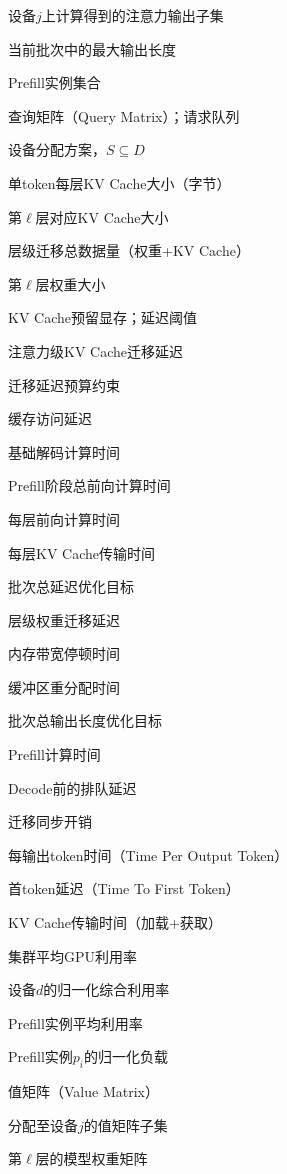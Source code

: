 \begin{denotation}[3cm]
  \item[$O^{(j)}$]设备$j$上计算得到的注意力输出子集
  \item[$O_{CM}$]当前批次中的最大输出长度
  \item[$P$]Prefill实例集合
  \item[$Q$]查询矩阵（Query Matrix）；请求队列
  \item[$S$]设备分配方案，$S\subseteq D$
  \item[$S_{kv}$]单token每层KV Cache大小（字节）
  \item[$S^{kv}_\ell$]第$\ell$层对应KV Cache大小
  \item[$S^{\text{total}}_\ell$]层级迁移总数据量（权重+KV Cache）
  \item[$S^w_\ell$]第$\ell$层权重大小
  \item[$T$]KV Cache预留显存；延迟阈值
  \item[$T_{\text{attn}}$]注意力级KV Cache迁移延迟
  \item[$T_{\text{budget}}$]迁移延迟预算约束
  \item[$T_c$]缓存访问延迟
  \item[$T_d$]基础解码计算时间
  \item[$T_F$]Prefill阶段总前向计算时间
  \item[$T_{F,\text{layer}}$]每层前向计算时间
  \item[$T_{\text{KV}}$]每层KV Cache传输时间
  \item[$T_l$]批次总延迟优化目标
  \item[$T_{\text{layer}}$]层级权重迁移延迟
  \item[$T_m$]内存带宽停顿时间
  \item[$T_{\text{mem\_realloc}}$]缓冲区重分配时间
  \item[$T_o$]批次总输出长度优化目标
  \item[$T_p$]Prefill计算时间
  \item[$T_q$]Decode前的排队延迟
  \item[$T_{\text{sync}}$]迁移同步开销
  \item[$T_{\text{TPOT}}$]每输出token时间（Time Per Output Token）
  \item[$T_{\text{TTFT}}$]首token延迟（Time To First Token）
  \item[$T_x$]KV Cache传输时间（加载+获取）
  \item[$U_{\text{avg}}$]集群平均GPU利用率
  \item[$U_d$]设备$d$的归一化综合利用率
  \item[$U_p$]Prefill实例平均利用率
  \item[$U_{p_i}$]Prefill实例$p_i$的归一化负载
  \item[$V$]值矩阵（Value Matrix）
  \item[$V^{(j)}$]分配至设备$j$的值矩阵子集
  \item[$W_\ell$]第$\ell$层的模型权重矩阵


\end{denotation}
